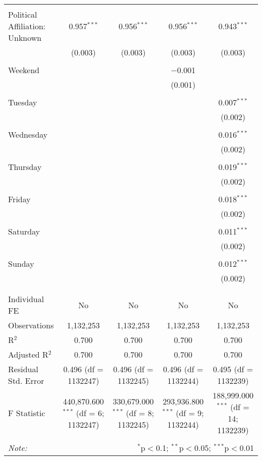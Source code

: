 \documentclass[
]{article}
\begin{document}
\begin{table}[!htbp]
{\begin{tabular}{@{\extracolsep{5pt}}lcccc}
  & & & & \\ 
 Political Affiliation: Unknown & 0.957$^{***}$ & 0.956$^{***}$ & 0.956$^{***}$ & 0.943$^{***}$ \\ 
  & (0.003) & (0.003) & (0.003) & (0.003) \\ 
  & & & & \\ 
 Weekend &  &  & $-$0.001 &  \\ 
  &  &  & (0.001) &  \\ 
  & & & & \\ 
 Tuesday &  &  &  & 0.007$^{***}$ \\ 
  &  &  &  & (0.002) \\ 
  & & & & \\ 
 Wednesday &  &  &  & 0.016$^{***}$ \\ 
  &  &  &  & (0.002) \\ 
  & & & & \\ 
 Thursday &  &  &  & 0.019$^{***}$ \\ 
  &  &  &  & (0.002) \\ 
  & & & & \\ 
 Friday &  &  &  & 0.018$^{***}$ \\ 
  &  &  &  & (0.002) \\ 
  & & & & \\ 
 Saturday &  &  &  & 0.011$^{***}$ \\ 
  &  &  &  & (0.002) \\ 
  & & & & \\ 
 Sunday &  &  &  & 0.012$^{***}$ \\ 
  &  &  &  & (0.002) \\ 
  & & & & \\ 
\hline \\[-1.8ex] 
Individual FE & No & No & No & No \\ 
Observations & 1,132,253 & 1,132,253 & 1,132,253 & 1,132,253 \\ 
R$^{2}$ & 0.700 & 0.700 & 0.700 & 0.700 \\ 
Adjusted R$^{2}$ & 0.700 & 0.700 & 0.700 & 0.700 \\ 
Residual Std. Error & 0.496 (df = 1132247) & 0.496 (df = 1132245) & 0.496 (df = 1132244) & 0.495 (df = 1132239) \\ 
F Statistic & 440,870.600$^{***}$ (df = 6; 1132247) & 330,679.000$^{***}$ (df = 8; 1132245) & 293,936.800$^{***}$ (df = 9; 1132244) & 188,999.000$^{***}$ (df = 14; 1132239) \\ 
\hline 
\hline \\[-1.8ex] 
\textit{Note:}  & \multicolumn{4}{r}{$^{*}$p$<$0.1; $^{**}$p$<$0.05; $^{***}$p$<$0.01} \\ 
\end{tabular}
} 
\end{table} 
\newpage
\end{document}
